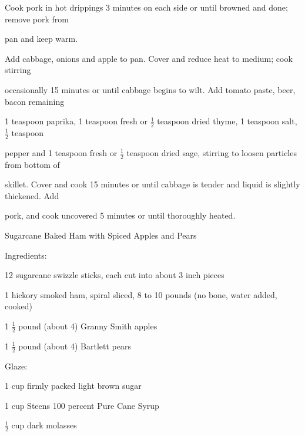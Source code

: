 \documentclass[a4paper,portrait,12pt]{book}
\begin{document}
Cook pork in hot drippings 3 minutes on each side or until browned and done; remove pork from




pan and keep warm.




Add cabbage, onions and apple to pan. Cover and reduce heat to medium; cook stirring




occasionally 15 minutes or until cabbage begins to wilt. Add tomato paste, beer, bacon remaining




1 teaspoon paprika, 1 teaspoon fresh or $\frac{1}{2}$ teaspoon dried thyme, 1 teaspoon salt, $\frac{1}{2}$ teaspoon




pepper and 1 teaspoon fresh or $\frac{1}{2}$ teaspoon dried sage, stirring to loosen particles from bottom of




skillet. Cover and cook 15 minutes or until cabbage is tender and liquid is slightly thickened. Add




pork, and cook uncovered 5 minutes or until thoroughly heated.







\newpage
Sugarcane Baked Ham with Spiced Apples and Pears




Ingredients:




12 sugarcane swizzle sticks, each cut into about 3 inch pieces




1 hickory smoked ham, spiral sliced, 8 to 10 pounds (no bone, water added, cooked)




1 $\frac{1}{2}$ pound (about 4) Granny Smith apples




1 $\frac{1}{2}$ pound (about 4) Bartlett pears




Glaze:




1 cup firmly packed light brown sugar




1 cup Steens 100 percent Pure Cane Syrup




$\frac{1}{2}$ cup dark molasses
\end{document}
